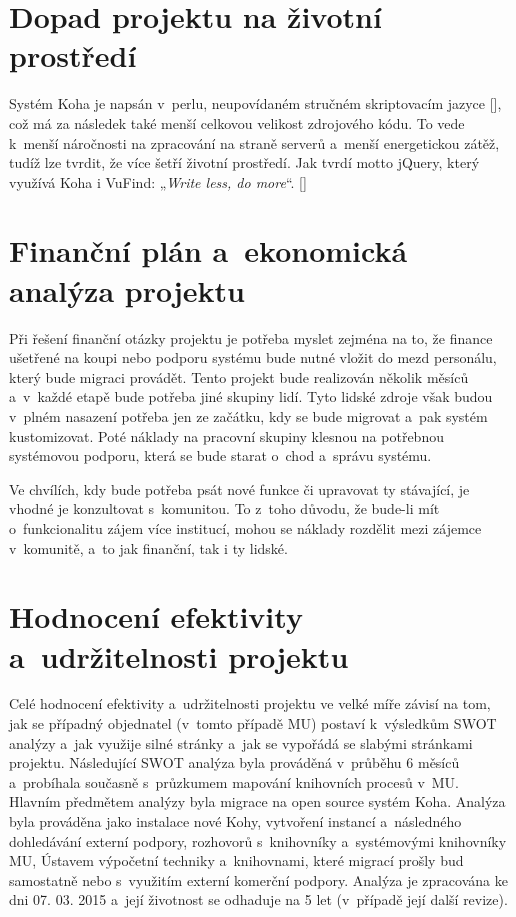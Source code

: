 \documentclass[
	11pt, oneside, printed, final, palatino, monochrome
	microtype,
	table,   %
	lof,     %
	lot     %
]{fithesis3}
\makeatletter
\newcommand{\citepages}[2]{[\cite[#1]{#2}]}
\newcommand{\citesource}[1]{[\cite{#1}]}
\newcommand{\citace}[1]{„\textit{#1}“} %
\makeatother
\begin{document}
{\section{Dopad projektu na životní prostředí}
Systém Koha je napsán v~perlu, neupovídaném stručném skriptovacím jazyce \citepages{v-ix}{Wall1997}, což má za následek také menší celkovou velikost zdrojového kódu. To vede k~menší náročnosti na zpracování na straně serverů a~menší energetickou zátěž, tudíž lze tvrdit, že více šetří životní prostředí. Jak tvrdí motto jQuery, který využívá Koha i VuFind: \citace{Write less, do more}. \citesource{jquery_2016}

\section{Finanční plán a~ekonomická analýza projektu}
Při řešení finanční otázky projektu je potřeba myslet zejména na to, že finance ušetřené na koupi nebo podporu systému bude nutné vložit do mezd personálu, který bude migraci provádět. Tento projekt bude realizován několik měsíců a~v~každé etapě bude potřeba jiné skupiny lidí. Tyto lidské zdroje však budou v~plném nasazení potřeba jen ze začátku, kdy se bude migrovat a~pak systém kustomizovat. Poté náklady na pracovní skupiny klesnou na potřebnou systémovou podporu, která se bude starat o~chod a~správu systému.

Ve chvílích, kdy bude potřeba psát nové funkce či upravovat ty stávající, je vhodné je konzultovat s~komunitou. To z~toho důvodu, že bude-li mít o~funkcionalitu zájem více institucí, mohou se náklady rozdělit mezi zájemce v~komunitě, a~to jak finanční,  tak i ty lidské.

\section{Hodnocení efektivity a~udržitelnosti projektu}
Celé hodnocení efektivity a~udržitelnosti projektu ve velké míře závisí na tom, jak se případný objednatel (v~tomto případě MU) postaví k~výsledkům SWOT analýzy a~jak využije silné stránky a~jak se vypořádá se slabými stránkami projektu. Následující SWOT analýza byla prováděná v~průběhu 6 měsíců a~probíhala současně s~průzkumem mapování knihovních procesů v~MU. Hlavním předmětem analýzy byla migrace na open source systém Koha. Analýza byla prováděna jako instalace nové Kohy, vytvoření instancí a~následného dohledávání externí podpory, rozhovorů s~knihovníky a~systémovými knihovníky MU, Ústavem výpočetní techniky a~knihovnami, které migrací prošly bud samostatně nebo s~využitím externí komerční podpory. Analýza je zpracována ke dni 07. 03. 2015 a~její životnost se odhaduje na 5 let (v~případě její další revize).

}
\end{document}
